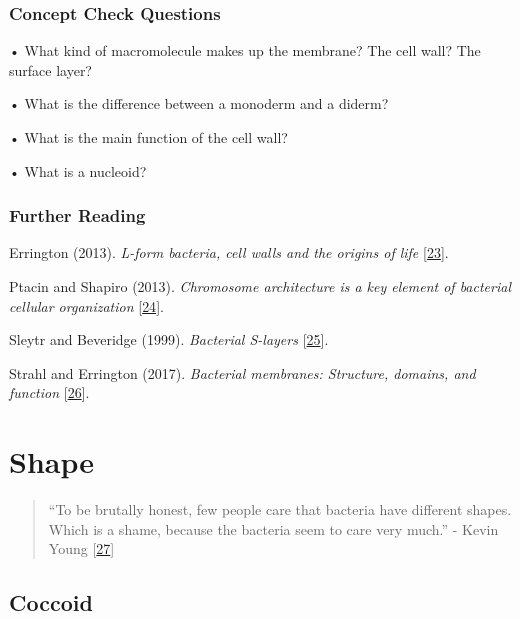 \documentclass[]{tufte-book}
\begin{document}
\hypertarget{concept-check-questions-1}{%
\subsection*{Concept Check Questions}\label{concept-check-questions-1}}

• What kind of macromolecule makes up the membrane? The cell wall? The surface layer?

• What is the difference between a monoderm and a diderm?

• What is the main function of the cell wall?

• What is a nucleoid?

\hypertarget{further-reading-1}{%
\subsection*{Further Reading}\label{further-reading-1}}

Errington (2013). \emph{L-form bacteria, cell walls and the origins of life} {[}\protect\hyperlink{ref-errington2013}{23}{]}.

Ptacin and Shapiro (2013). \emph{Chromosome architecture is a key element of bacterial cellular organization} {[}\protect\hyperlink{ref-ptacin2013}{24}{]}.

Sleytr and Beveridge (1999). \emph{Bacterial S-layers} {[}\protect\hyperlink{ref-sleytr1999}{25}{]}.

Strahl and Errington (2017). \emph{Bacterial membranes: Structure, domains, and function} {[}\protect\hyperlink{ref-strahl2017}{26}{]}.

\hypertarget{shape}{%
\chapter{Shape}\label{shape}}

\begin{quote}
``To be brutally honest, few people care that bacteria have different shapes. Which is a shame, because the bacteria seem to care very much.''
- Kevin Young {[}\protect\hyperlink{ref-young2006}{27}{]}
\end{quote}

\hypertarget{coccoid}{%
\section{Coccoid}\label{coccoid}}
\end{document}
